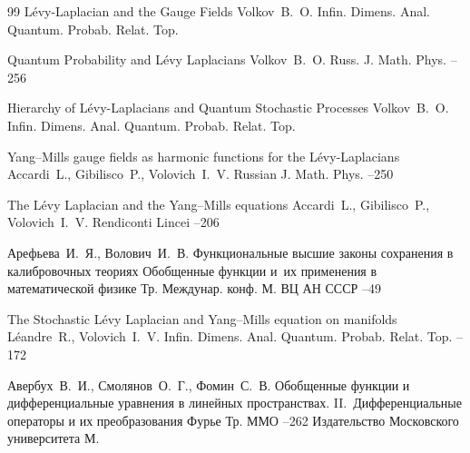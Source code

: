 \begin{thebibliography}{99}
\paper L\'evy-Laplacian and the Gauge Fields
\by Volkov~B.~O.
\jour Infin. Dimens. Anal. Quantum. Probab. Relat. Top. 



\paper Quantum Probability and L\'evy Laplacians
\by Volkov~B.~O.
\jour Russ. J. Math. Phys.
--256


\paper Hierarchy of L\'evy-Laplacians and Quantum Stochastic Processes
\by Volkov~B.~O.
\jour Infin. Dimens. Anal. Quantum. Probab. Relat. Top. 


\paper Yang--Mills gauge fields as harmonic  functions for the L\'evy-Laplacians
\by Accardi~L., Gibilisco~P., Volovich~I.~V.
\jour  Russian J. Math. Phys.
--250





\paper  The L\'evy Laplacian and the Yang--Mills equations
\by Accardi~L., Gibilisco~P., Volovich~I.~V.
\jour Rendiconti Lincei
--206



\by  Арефьева~И.~Я., Волович~И.~В.
\paper Функциональные высшие законы сохранения в калибровочных теориях
\inbook Обобщенные функции и~их применения в математической физике
\bookinfo Тр. Междунар. конф. 
\publaddr М.
\publ ВЦ АН СССР
--49


\paper The Stochastic L\'evy Laplacian and Yang--Mills equation on manifolds
\by L\'eandre~R., Volovich~I.~V.
\jour Infin. Dimens. Anal. Quantum. Probab. Relat. Top. 
--172




\by Авербух~В.~И., Смолянов~О.~Г., Фомин~С.~В.
\paper Обобщенные функции и дифференциальные уравнения в линейных пространствах. II.~Дифференциальные операторы и их преобразования Фурье
\serial Тр. ММО
--262
\publ Издательство Московского университета
\publaddr М.





\end{thebibliography}
